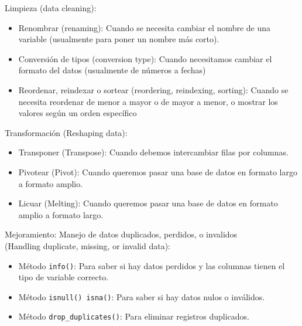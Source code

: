 \documentclass[aspectratio=169]{beamer}
\begin{document}
\begin{frame}
Limpieza (data cleaning):\\
\vspace{0.5cm}
\begin{itemize}
\item Renombrar (renaming): Cuando se necesita cambiar el nombre de una variable (usualmente para poner un nombre más corto).
\item Conversión de tipos (conversion type): Cuando necesitamos cambiar el formato del datos (usualmente de números a fechas)
\item Reordenar, reindexar o sortear (reordering, reindexing, sorting): Cuando se necesita reordenar de menor a mayor o de mayor a menor, o mostrar los valores según un orden específico
\end{itemize}
\end{frame}

\begin{frame}
Transformación (Reshaping data):\\
\vspace{0.5cm}
\begin{itemize}
\item Transponer (Transpose): Cuando debemos intercambiar filas por columnas.
\item Pivotear (Pivot): Cuando queremos pasar una base de datos en formato largo a formato amplio.
\item Licuar (Melting): Cuando queremos pasar una base de datos en formato amplio a formato largo.
\end{itemize}
\end{frame}

\begin{frame}
Mejoramiento: Manejo de datos duplicados, perdidos, o invalidos\\
(Handling duplicate, missing, or invalid data):\\
\vspace{0.5cm}
\begin{itemize}
\item Método \texttt{info()}: Para saber si hay datos perdidos y las columnas tienen el tipo de variable correcto.
\item Método \texttt{isnull() isna()}: Para saber si hay datos nulos o inválidos.
\item Método \texttt{drop\_duplicates()}: Para eliminar registros duplicados.
\end{itemize}
\end{frame}
\end{document}
